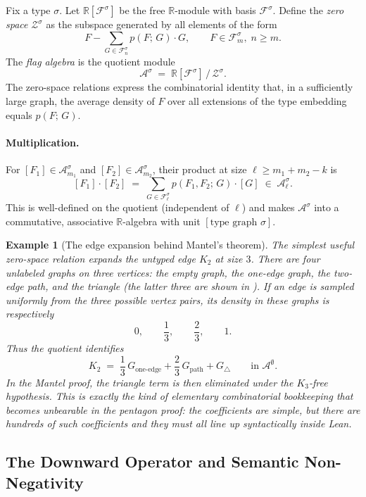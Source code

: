 \documentclass{article}
\newtheorem{example}[theorem]{Example}
\newcommand{\den}[2]{p(#1;\,#2)}
\begin{document}
Fix a type $\sigma$.  Let $\mathbb{R}[\mathcal{F}^\sigma]$ be the free
$\mathbb{R}$-module with basis $\mathcal{F}^\sigma$.
Define the \emph{zero space} $\mathcal{Z}^\sigma$ as the subspace generated
by all elements of the form
\[
  F - \sum_{G \in \mathcal{F}^\sigma_n} \den{F}{G} \cdot G,
  \qquad F \in \mathcal{F}^\sigma_m,\; n \geq m.
\]
The \emph{flag algebra} is the quotient module
\[
  \mathcal{A}^\sigma \;=\; \mathbb{R}[\mathcal{F}^\sigma] \,/\, \mathcal{Z}^\sigma.
\]
The zero-space relations express the combinatorial identity that, in a
sufficiently large graph, the average density of $F$ over all extensions of
the type embedding equals $\den{F}{G}$.

\paragraph{Multiplication.}
For $[F_1] \in \mathcal{A}^\sigma_{m_1}$ and $[F_2] \in \mathcal{A}^\sigma_{m_2}$,
their product at size $\ell \geq m_1 + m_2 - k$ is
\[
  [F_1] \cdot [F_2]
  \;=\;
  \sum_{G \in \mathcal{F}^\sigma_\ell} \den{F_1,F_2}{G} \cdot [G]
  \;\in\; \mathcal{A}^\sigma_\ell.
\]
This is well-defined on the quotient (independent of $\ell$) and makes
$\mathcal{A}^\sigma$ into a commutative, associative $\mathbb{R}$-algebra
with unit $[\text{type graph } \sigma]$.

\begin{example}[The edge expansion behind Mantel's theorem]
  The simplest useful zero-space relation expands the untyped edge $K_2$ at
  size $3$.  There are four unlabeled graphs on three vertices: the empty
  graph, the one-edge graph, the two-edge path, and the triangle
  (the latter three are shown in ).  If an
  edge is sampled uniformly from the three possible vertex pairs, its density
  in these graphs is respectively
  \[
    0,\qquad \frac13,\qquad \frac23,\qquad 1.
  \]
  Thus the quotient identifies
  \[
    K_2
    \;=\;
    \frac13\,G_{\text{one-edge}}
    + \frac23\,G_{\text{path}}
    + G_{\triangle}
    \qquad\text{in } \mathcal{A}^{\emptyset}.
  \]
  In the Mantel proof, the triangle term is then eliminated under the
  $K_3$-free hypothesis.  This is exactly the kind of elementary
  combinatorial bookkeeping that becomes unbearable in the pentagon proof:
  the coefficients are simple, but there are hundreds of such coefficients
  and they must all line up syntactically inside Lean.
\end{example}

\subsection{The Downward Operator and Semantic Non-Negativity}
\end{document}
